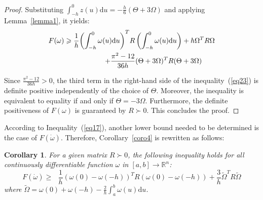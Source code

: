 \documentclass[a4paper]{cas-sc}
\newtheorem*{proof}{Proof}
\newtheorem{corollary}[theorem]{Corollary}
\begin{document}
\begin{proof}
  Substituting $ \int_{ - h}^0 z (u){\text{d}}u =  - \frac{h}{6}(\Theta  + 3\Omega ) $ and applying Lemma~\ref{lemma1}, it yields:
  \begin{equation}
    \begin{gathered}
      F(\omega ) \geqslant \frac{1}{h}{\left( {\int_{ - h}^0 {\omega (u){\text{d}}u} } \right)^T}R\left( {\int_{ - h}^0 {\omega (u){\text{d}}u} } \right) + h{\Omega ^T}R\Omega  \hfill \\
      \quad \quad \quad \quad \quad \quad \quad \quad  + \frac{{{\pi ^2} - 12}}{{36h}}{(\Theta  + 3\Omega )^T}R(\Theta  + 3\Omega ) \hfill \\
    \end{gathered}
    \label{eq23}
  \end{equation}

  Since $ \frac{{{\pi ^2} - 12}}{{36h}} > 0 $, the third term in the right-hand side of the inequality~(\ref{eq23}) is definite positive independently of the choice of $ \Theta  $. Moreover, the inequality is equivalent to equality if and only if $ \Theta  =  - 3\Omega  $. Furthermore, the definite positiveness of $ F(\omega ) $ is guaranteed by $ R \succ 0 $. This concludes the proof.

\end{proof}



According to Inequality~(\ref{eq17}), another lower bound needed to be determined is the case of $ F(\dot \omega ) $. Therefore, Corollary~\ref{coro4} is rewritten as follows:
\begin{corollary}
  \label{coro5}
  For a given matrix $ R \succ 0 $, the following inequality holds for all continuously differentiable function $ \omega  $ in $ [a,b] \to {\mathbb{R}^n} $:
  \begin{equation}
    \label{eq24}
    F(\dot \omega ) \geqslant {\text{ }}\frac{1}{h}{(\omega (0) - \omega ( - h))^T}R(\omega (0) - \omega ( - h)) + \frac{3}{h}{\tilde \Omega ^T}R\tilde \Omega
  \end{equation}
  where $ \tilde \Omega  = \omega (0) + \omega ( - h) - \frac{2}{h}\int_a^b \omega  (u){\text{d}}u $.
\end{corollary}
\end{document}
